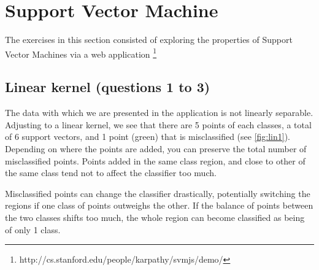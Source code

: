 \documentclass[11pt, a4paper]{article}
\begin{document}
\section{Support Vector Machine}

The exercises in this section consisted of exploring the properties of
Support Vector Machines via a web application
\footnote{http://cs.stanford.edu/people/karpathy/svmjs/demo/}

\subsection{Linear kernel (questions 1 to 3)}
The data with which we are presented in the application is not
linearly separable. Adjusting to a linear kernel, we see that there
are 5 points of each classes, a total of 6 support vectors, and 1
point (green) that is misclassified (see \ref{fig:lin1}). Depending on
where the points are added, you can preserve the total number of
misclassified points. Points added in the same class region, and close
to other of the same class tend not to affect the classifier too much.

Misclassified points can change the classifier drastically,
potentially switching the regions if one class of points outweighs the
other. If the balance of points between the two classes shifts too
much, the whole region can become classified as being of only 1 class.
 
\end{document}
